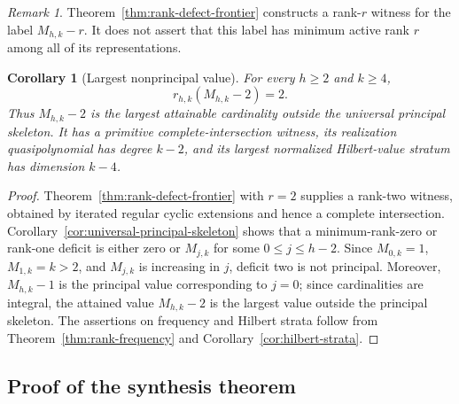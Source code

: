 \documentclass[11pt,reqno]{amsart}
\newtheorem{corollary}[theorem]{Corollary}
\theoremstyle{definition}
\theoremstyle{remark}
\newtheorem{remark}[theorem]{Remark}
\begin{document}
\begin{remark}\label{rem:rank-defect-label-scope}
Theorem~\ref{thm:rank-defect-frontier} constructs a rank-$r$ witness for the
label $M_{h,k}-r$.  It does not assert that this label has minimum active rank
$r$ among all of its representations.
\end{remark}

\begin{corollary}[Largest nonprincipal value]
\label{cor:largest-nonprincipal-value}
For every $h\geq2$ and $k\geq4$,
\[
 r_{h,k}(M_{h,k}-2)=2.
\]
Thus $M_{h,k}-2$ is the largest attainable cardinality outside the universal
principal skeleton.  It has a primitive complete-intersection witness, its
realization quasipolynomial has degree $k-2$, and its largest normalized
Hilbert-value stratum has dimension $k-4$.
\end{corollary}

\begin{proof}
Theorem~\ref{thm:rank-defect-frontier} with $r=2$ supplies a rank-two witness,
obtained by iterated regular cyclic extensions and hence a complete
intersection.  Corollary~\ref{cor:universal-principal-skeleton} shows that a
minimum-rank-zero or rank-one deficit is either zero or $M_{j,k}$ for some
$0\leq j\leq h-2$.  Since $M_{0,k}=1$, $M_{1,k}=k>2$, and $M_{j,k}$ is
increasing in $j$, deficit two is not principal.  Moreover, $M_{h,k}-1$ is
the principal value corresponding to $j=0$; since cardinalities are integral,
the attained value $M_{h,k}-2$ is the largest value outside the principal
skeleton.  The assertions on frequency and Hilbert strata follow from
Theorem~\ref{thm:rank-frequency} and Corollary~\ref{cor:hilbert-strata}.
\end{proof}

\subsection{Proof of the synthesis theorem}
\end{document}
